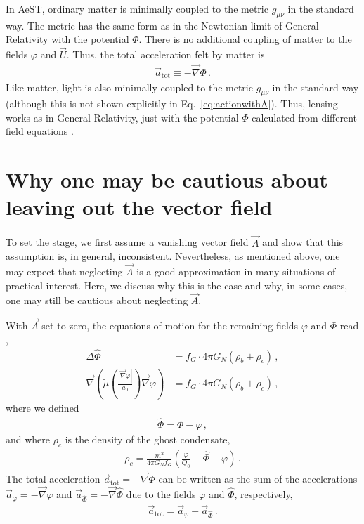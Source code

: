 \documentclass[reprint, amsmath,amssymb, nofootinbib, aps, prd]{revtex4-2}
\begin{document}
In AeST, ordinary matter is minimally coupled to the metric $g_{\mu \nu}$ in the standard way.
The metric has the same form as in the Newtonian limit of General Relativity with the potential $\Phi$.
There is no additional coupling of matter to the fields $\varphi$ and $\vec{U}$.
Thus, the total acceleration felt by matter is
\begin{align}
\vec{a}_{\mathrm{tot}} \equiv - \vec{\nabla} \Phi \,.
\end{align}
Like matter, light is also minimally coupled to the metric $g_{\mu \nu}$ in the standard way (although this is not shown explicitly in Eq.~\eqref{eq:actionwithA}).
Thus, lensing works as in General Relativity, just with the potential $\Phi$ calculated from different field equations \citep{Skordis2021, Mistele2023}.

\section{Why one may be cautious about leaving out the vector field}
\label{sec:novector}

To set the stage, we first assume a vanishing vector field $\vec{A}$ and show that this assumption is, in general, inconsistent.
Nevertheless, as mentioned above, one may expect that neglecting $\vec{A}$ is a good approximation in many situations of practical interest.
Here, we discuss why this is the case and why, in some cases, one may still be cautious about neglecting $\vec{A}$.

With $\vec{A}$ set to zero, the equations of motion for the remaining fields $\varphi$ and $\Phi$ read \citep{Skordis2020},
\begin{subequations}
\label{eq:eomA0}
\begin{align}
\Delta \hat{\Phi} &= f_G \cdot 4 \pi G_N \left(\rho_b + \rho_c\right) \,, \\
\vec{\nabla} \left( \tilde{\mu}\left(\frac{|\vec{\nabla} \varphi|}{a_0}\right) \vec{\nabla} \varphi \right) &=  f_G \cdot 4 \pi G_N \left(\rho_b + \rho_c \right) \,,
\end{align}
\end{subequations}
where we defined
\begin{align}
 \hat{\Phi} = \Phi - \varphi \,,
\end{align}
and where $\rho_c$ is the density of the ghost condensate,
\begin{align}
 \label{eq:rhoc}
 \rho_c = \frac{m^2}{4 \pi G_N f_G} \left(\frac{\dot{\varphi}}{Q_0} -\hat{\Phi} - \varphi\right) \,.
\end{align}
The total acceleration $\vec{a}_{\mathrm{tot}} = - \vec{\nabla} \Phi$ can be written as the sum of the accelerations $\vec{a}_\varphi = -\vec{\nabla} \varphi$ and $\vec{a}_{\hat{\Phi}} = - \vec{\nabla} \hat{\Phi}$ due to the fields $\varphi$ and $\hat{\Phi}$, respectively,
\begin{align}
 \vec{a}_{\mathrm{tot}} = \vec{a}_{\varphi} + \vec{a}_{\hat{\Phi}} \,.
\end{align}
\end{document}
